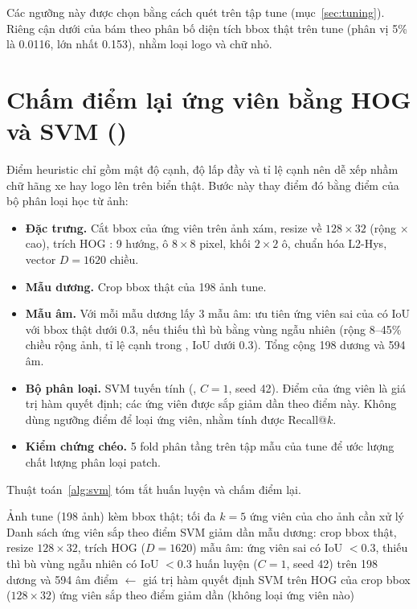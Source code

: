Các ngưỡng này được chọn bằng cách quét trên tập tune (mục~\ref{sec:tuning}). Riêng cận dưới của  bám theo phân bố diện tích bbox thật trên tune (phân vị 5\% là 0.0116, lớn nhất 0.153), nhằm loại logo và chữ nhỏ.

\section{Chấm điểm lại ứng viên bằng HOG và SVM ()}
\label{sec:hogsvm}

Điểm heuristic chỉ gồm mật độ cạnh, độ lấp đầy và tỉ lệ cạnh nên dễ xếp nhầm chữ hãng xe hay logo lên trên biển thật. Bước này thay điểm đó bằng điểm của bộ phân loại học từ ảnh:
\begin{itemize}
  \item \textbf{Đặc trưng.} Cắt bbox của ứng viên trên ảnh xám, resize về $128\times 32$ (rộng $\times$ cao), trích HOG \cite{hog}: 9 hướng, ô $8\times 8$ pixel, khối $2\times 2$ ô, chuẩn hóa L2-Hys, vector $D=1620$ chiều.
  \item \textbf{Mẫu dương.} Crop bbox thật của 198 ảnh tune.
  \item \textbf{Mẫu âm.} Với mỗi mẫu dương lấy 3 mẫu âm: ưu tiên ứng viên sai của  có IoU với bbox thật dưới 0.3, nếu thiếu thì bù bằng vùng ngẫu nhiên (rộng 8--45\% chiều rộng ảnh, tỉ lệ cạnh trong , IoU dưới 0.3). Tổng cộng 198 dương và 594 âm.
  \item \textbf{Bộ phân loại.} SVM tuyến tính \cite{svm} (, $C=1$, seed 42). Điểm của ứng viên là giá trị hàm quyết định; các ứng viên được sắp giảm dần theo điểm này. Không dùng ngưỡng điểm để loại ứng viên, nhằm tính được Recall@$k$.
  \item \textbf{Kiểm chứng chéo.} 5 fold phân tầng trên tập mẫu của tune để ước lượng chất lượng phân loại patch.
\end{itemize}
Thuật toán~\ref{alg:svm} tóm tắt huấn luyện và chấm điểm lại.

\begin{algorithm}[htbp]
\caption{Huấn luyện SVM và xếp lại ứng viên ()}
\label{alg:svm}
\begin{algorithmic}[1]
\Require Ảnh tune (198 ảnh) kèm bbox thật; tối đa $k=5$ ứng viên của  cho ảnh cần xử lý
\Ensure Danh sách ứng viên sắp theo điểm SVM giảm dần
        \State mẫu dương: crop bbox thật, resize $128\times 32$, trích HOG ($D=1620$)
         mẫu âm: ứng viên sai có IoU $<0.3$, thiếu thì bù vùng ngẫu nhiên có IoU $<0.3$
    \EndFor
    \State huấn luyện  ($C=1$, seed 42) trên 198 dương và 594 âm
\EndProcedure
{}
        \State điểm $\gets$ giá trị hàm quyết định SVM trên HOG của crop bbox ($128\times 32$)
    \EndFor
    \State \Return ứng viên sắp theo điểm giảm dần (không loại ứng viên nào)
\EndProcedure
\end{algorithmic}
\end{algorithm}

